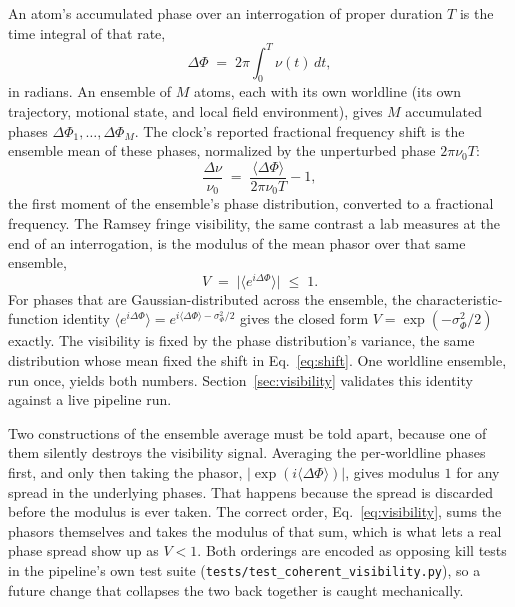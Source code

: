 \documentclass[aps,pra,superscriptaddress,groupedaddress,nofootinbib]{revtex4-2}
\begin{document}
An atom's accumulated phase over an interrogation of proper duration
$T$ is the time integral of that rate,
\begin{equation}
  \Delta\Phi \;=\; 2\pi \int_0^T \nu(t)\,dt ,
  \label{eq:phase}
\end{equation}
in radians. An ensemble of $M$ atoms, each with its own worldline
(its own trajectory, motional state, and local field environment),
gives $M$ accumulated phases $\Delta\Phi_1,\dots,\Delta\Phi_M$. The
clock's reported fractional frequency shift is the ensemble mean of
these phases, normalized by the unperturbed phase $2\pi\nu_0 T$:
\begin{equation}
  \frac{\Delta\nu}{\nu_0} \;=\; \frac{\langle\Delta\Phi\rangle}{2\pi\nu_0 T} - 1 ,
  \label{eq:shift}
\end{equation}
the first moment of the ensemble's phase distribution, converted to a
fractional frequency. The Ramsey fringe visibility, the same
contrast a lab measures at the end of an interrogation, is the
modulus of the mean phasor over that same ensemble,
\begin{equation}
  V \;=\; \bigl|\langle e^{i\Delta\Phi}\rangle\bigr| \;\le\; 1 .
  \label{eq:visibility}
\end{equation}
For phases that are Gaussian-distributed across the ensemble, the
characteristic-function identity $\langle e^{i\Delta\Phi}\rangle =
e^{i\langle\Delta\Phi\rangle - \sigma_\Phi^2/2}$ gives the closed form
$V = \exp(-\sigma_\Phi^2/2)$ exactly. The visibility is fixed by the
phase distribution's variance, the same distribution whose mean
fixed the shift in Eq.~\eqref{eq:shift}. One worldline ensemble, run once, yields both
numbers. Section~\ref{sec:visibility} validates this identity against
a live pipeline run.

Two constructions of the ensemble average must be told apart, because
one of them silently destroys the visibility signal. Averaging the
per-worldline phases first, and only then taking the phasor,
$|\exp(i\langle\Delta\Phi\rangle)|$, gives modulus $1$ for any spread
in the underlying phases. That happens because the spread is
discarded before the modulus is ever taken. The correct order,
Eq.~\eqref{eq:visibility},
sums the phasors themselves and takes the modulus of that sum, which
is what lets a real phase spread show up as $V<1$. Both orderings are
encoded as opposing kill tests in the pipeline's own test suite
(\texttt{tests/test\_coherent\_visibility.py}), so a future change that
collapses the two back together is caught mechanically.
\end{document}
